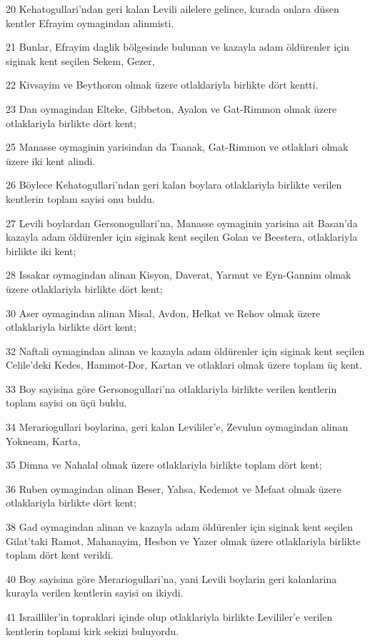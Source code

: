 \par 20 Kehatogullari'ndan geri kalan Levili ailelere gelince, kurada onlara düsen kentler Efrayim oymagindan alinmisti.
\par 21 Bunlar, Efrayim daglik bölgesinde bulunan ve kazayla adam öldürenler için siginak kent seçilen Sekem, Gezer,
\par 22 Kivsayim ve Beythoron olmak üzere otlaklariyla birlikte dört kentti.
\par 23 Dan oymagindan Elteke, Gibbeton, Ayalon ve Gat-Rimmon olmak üzere otlaklariyla birlikte dört kent;
\par 25 Manasse oymaginin yarisindan da Taanak, Gat-Rimmon ve otlaklari olmak üzere iki kent alindi.
\par 26 Böylece Kehatogullari'ndan geri kalan boylara otlaklariyla birlikte verilen kentlerin toplam sayisi onu buldu.
\par 27 Levili boylardan Gersonogullari'na, Manasse oymaginin yarisina ait Basan'da kazayla adam öldürenler için siginak kent seçilen Golan ve Beestera, otlaklariyla birlikte iki kent;
\par 28 Issakar oymagindan alinan Kisyon, Daverat, Yarmut ve Eyn-Gannim olmak üzere otlaklariyla birlikte dört kent;
\par 30 Aser oymagindan alinan Misal, Avdon, Helkat ve Rehov olmak üzere otlaklariyla birlikte dört kent;
\par 32 Naftali oymagindan alinan ve kazayla adam öldürenler için siginak kent seçilen Celile'deki Kedes, Hammot-Dor, Kartan ve otlaklari olmak üzere toplam üç kent.
\par 33 Boy sayisina göre Gersonogullari'na otlaklariyla birlikte verilen kentlerin toplam sayisi on üçü buldu.
\par 34 Merariogullari boylarina, geri kalan Levililer'e, Zevulun oymagindan alinan Yokneam, Karta,
\par 35 Dimna ve Nahalal olmak üzere otlaklariyla birlikte toplam dört kent;
\par 36 Ruben oymagindan alinan Beser, Yahsa, Kedemot ve Mefaat olmak üzere otlaklariyla birlikte dört kent;
\par 38 Gad oymagindan alinan ve kazayla adam öldürenler için siginak kent seçilen Gilat'taki Ramot, Mahanayim, Hesbon ve Yazer olmak üzere otlaklariyla birlikte toplam dört kent verildi.
\par 40 Boy sayisina göre Merariogullari'na, yani Levili boylarin geri kalanlarina kurayla verilen kentlerin sayisi on ikiydi.
\par 41 Israilliler'in topraklari içinde olup otlaklariyla birlikte Levililer'e verilen kentlerin toplami kirk sekizi buluyordu.

